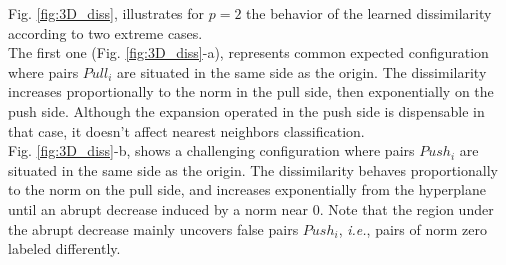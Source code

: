 Fig. \ref{fig:3D_diss}, illustrates for $p = 2$ the behavior of the learned dissimilarity according to two extreme cases. \\
The first one (Fig. \ref{fig:3D_diss}-a), represents common expected configuration where pairs $Pull_i$ are situated in the same side as the origin. The dissimilarity increases proportionally to the norm in the pull side, then exponentially on the push side. Although the expansion operated in the push side is dispensable in that case, it doesn’t affect nearest neighbors classification. \\
Fig. \ref{fig:3D_diss}-b, shows a challenging configuration where pairs $Push_i$ are situated in the same side as the origin. The dissimilarity behaves proportionally to the norm on the pull side, and increases exponentially from the hyperplane until an abrupt decrease induced by a norm near 0. Note that the region under the abrupt decrease mainly uncovers false pairs $Push_i$, \textit{i.e.}, pairs of norm zero labeled differently.

